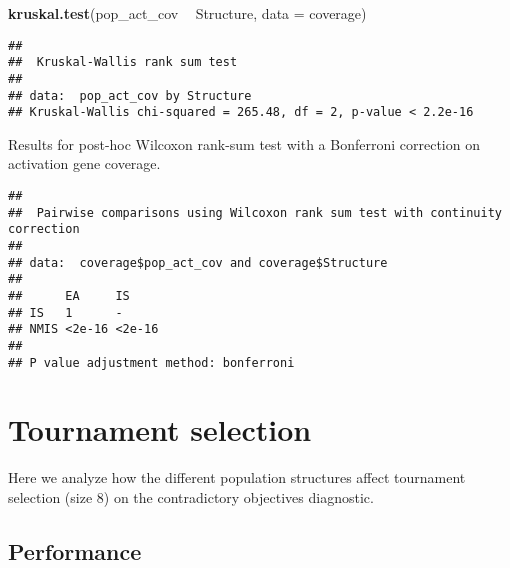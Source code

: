 \documentclass[]{book}
\newenvironment{Shaded}{\begin{snugshade}}{\end{snugshade}}
\newcommand{\DataTypeTok}[1]{\textcolor[rgb]{0.13,0.29,0.53}{#1}}
\newcommand{\KeywordTok}[1]{\textcolor[rgb]{0.13,0.29,0.53}{\textbf{#1}}}
\newcommand{\NormalTok}[1]{#1}
\newcommand{\OperatorTok}[1]{\textcolor[rgb]{0.81,0.36,0.00}{\textbf{#1}}}
\newcommand{\OtherTok}[1]{\textcolor[rgb]{0.56,0.35,0.01}{#1}}
\newcommand{\StringTok}[1]{\textcolor[rgb]{0.31,0.60,0.02}{#1}}
\begin{document}
\begin{Shaded}
\begin{Highlighting}[]
\KeywordTok{kruskal.test}\NormalTok{(pop_act_cov }\OperatorTok{~}\StringTok{ }\NormalTok{Structure, }\DataTypeTok{data =}\NormalTok{ coverage)}
\end{Highlighting}
\end{Shaded}

\begin{verbatim}
## 
##  Kruskal-Wallis rank sum test
## 
## data:  pop_act_cov by Structure
## Kruskal-Wallis chi-squared = 265.48, df = 2, p-value < 2.2e-16
\end{verbatim}

Results for post-hoc Wilcoxon rank-sum test with a Bonferroni correction on activation gene coverage.

\begin{Shaded}
\end{Shaded}

\begin{verbatim}
## 
##  Pairwise comparisons using Wilcoxon rank sum test with continuity correction 
## 
## data:  coverage$pop_act_cov and coverage$Structure 
## 
##      EA     IS    
## IS   1      -     
## NMIS <2e-16 <2e-16
## 
## P value adjustment method: bonferroni
\end{verbatim}

\hypertarget{tournament-selection-7}{%
\section{Tournament selection}\label{tournament-selection-7}}

Here we analyze how the different population structures affect tournament selection (size 8) on the contradictory objectives diagnostic.

\hypertarget{performance-4}{%
\subsection{Performance}\label{performance-4}}
\end{document}

